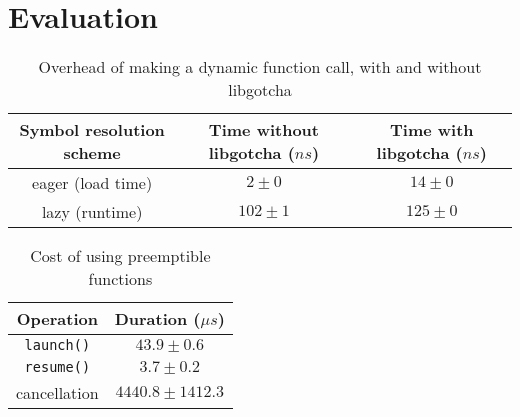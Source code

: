 \section{Evaluation}

\begin{table*}
\begin{center}
\begin{tabular}{c | c c}
Symbol resolution scheme & Time without libgotcha ($ns$) & Time with libgotcha ($ns$) \\
\hline
eager (load time) & $2 \pm 0$ & $14 \pm 0$ \\
lazy (runtime) & $102 \pm 1$ & $125 \pm 0$
\end{tabular}
\end{center}
\caption{Overhead of making a dynamic function call, with and without libgotcha}
\end{table*}


\begin{table}
\begin{center}
\begin{tabular}{c | c}
Operation & Duration ($\mu{s}$) \\
\hline
\texttt{launch()} & $43.9 \pm 0.6$ \\
\texttt{resume()} & $3.7 \pm 0.2$ \\
cancellation & $4440.8 \pm 1412.3$
\end{tabular}
\end{center}
\caption{Cost of using preemptible functions}
\end{table}


